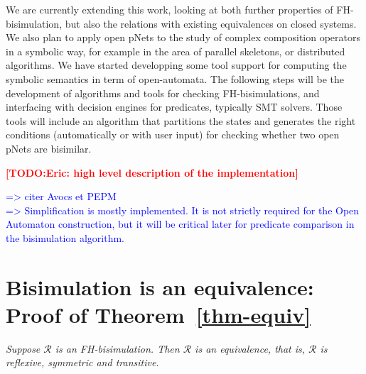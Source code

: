 \documentclass{lmcs}
\newcommand{\TODO}[1]{\textcolor{red}{\textbf{[TODO:#1]}}}
\newcommand{\ERIC}[1]{\textcolor{blue}{#1}}
\begin{document}
We are currently extending this work,  looking at  both further properties of 
FH-bisimulation, but also
the relations with existing equivalences on closed systems.
We also plan to apply open pNets to the study of complex composition
operators in a symbolic way, for example in the area of parallel
skeletons, or distributed algorithms.
We have started developping some tool support for computing the
symbolic semantics in term of open-automata. The following steps will
be the development of algorithms and tools for checking 
FH-bisimulations, and interfacing with decision engines for
predicates, typically SMT solvers. Those tools will include
an algorithm that partitions the states and generates the right
conditions (automatically or with user input) for checking
whether two open pNets are bisimilar.

\TODO{Eric: high level description of the implementation}

\ERIC{
  =>  citer Avocs et  PEPM\\
=> Simplification is mostly implemented. It is not strictly required for the Open Automaton construction, but it will be critical later for predicate comparison in the bisimulation algorithm.}





% 


\newpage
\appendix    

       \section{Bisimulation is an equivalence: Proof of Theorem~\ref{thm-equiv}}\label{thm-equiv-proof}
        \emph{Suppose $\mathcal{R}$ 
       	is an FH-bisimulation. Then $\mathcal{R}$ is an equivalence, that is, 
       	$\mathcal{R}$ is 
       	reflexive, symmetric and transitive.
       	}
       
\end{document}
